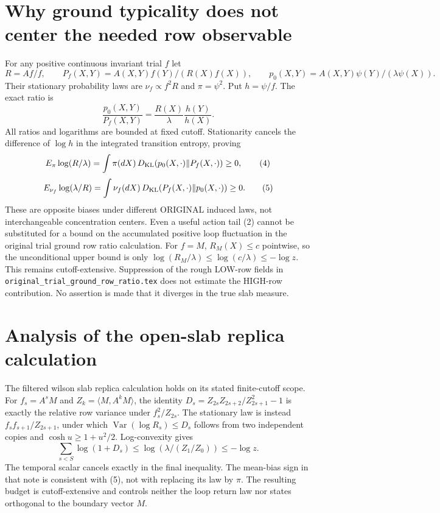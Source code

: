 \documentclass{article}
\begin{document}
\section*{Why ground typicality does not center the needed row observable}
For any positive continuous invariant trial $f$ let
\[
 R=Af/f,\qquad P_f(X,Y)=A(X,Y)f(Y)/(R(X)f(X)),
 \qquad p_0(X,Y)=A(X,Y)\psi(Y)/(\lambda\psi(X)).
\]
Their stationary probability laws are $\nu_f\propto f^2R$ and $\pi=\psi^2$. Put $h=\psi/f$. The exact ratio is
\[
 \frac{p_0(X,Y)}{P_f(X,Y)}=\frac{R(X)}\lambda\frac{h(Y)}{h(X)}.
\]
All ratios and logarithms are bounded at fixed cutoff. Stationarity cancels the difference of $\log h$ in the integrated transition entropy, proving
\[
 E_\pi\log(R/\lambda)
 =\int\pi(dX)\,D_{\rm KL}(p_0(X,\cdot)\Vert P_f(X,\cdot))\ge0,\tag{4}
\]
\[
 E_{\nu_f}\log(\lambda/R)
 =\int\nu_f(dX)\,D_{\rm KL}(P_f(X,\cdot)\Vert p_0(X,\cdot))\ge0.\tag{5}
\]
These are opposite biases under different ORIGINAL induced laws, not interchangeable concentration centers. Even a useful action tail (2) cannot be substituted for a bound on the accumulated positive loop fluctuation in the original trial ground row ratio calculation. For $f=M$, $R_M(X)\le c$ pointwise, so the unconditional upper bound is only $\log(R_M/\lambda)\le\log(c/\lambda)\le-\log z$. This remains cutoff-extensive. Suppression of the rough LOW-row fields in \texttt{original\_trial\_ground\_row\_ratio.tex} does not estimate the HIGH-row contribution. No assertion is made that it diverges in the true slab measure.

\section*{Analysis of the open-slab replica calculation}
The filtered wilson slab replica calculation holds on its stated finite-cutoff scope. For $f_s=A^sM$ and $Z_k=\langle M,A^kM\rangle$, the identity $D_s=Z_{2s}Z_{2s+2}/Z_{2s+1}^2-1$ is exactly the relative row variance under $f_s^2/Z_{2s}$. The stationary law is instead $f_sf_{s+1}/Z_{2s+1}$, under which $\operatorname{Var}(\log R_s)\le D_s$ follows from two independent copies and $\cosh u\ge1+u^2/2$. Log-convexity gives
\[
 \sum_{s<S}\log(1+D_s)\le\log(\lambda/(Z_1/Z_0))\le-\log z.
\]
The temporal scalar cancels exactly in the final inequality. The mean-bias sign in that note is consistent with (5), not with replacing its law by $\pi$. The resulting budget is cutoff-extensive and controls neither the loop return law nor states orthogonal to the boundary vector $M$.
\end{document}
